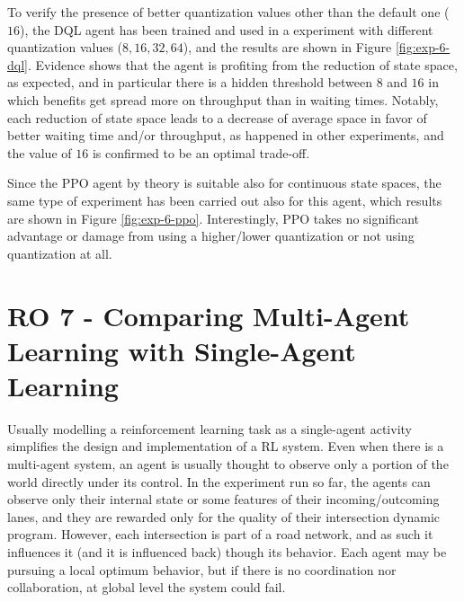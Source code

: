 To verify the presence of better quantization values other than the default one ($16$), the DQL agent has been trained and used in a experiment with different quantization values ($8, 16, 32, 64$), and the results are shown in Figure \ref{fig:exp-6-dql}.
Evidence shows that the agent is profiting from the reduction of state space, as expected, and in particular there is a hidden threshold between $8$ and $16$ in which benefits get spread more on throughput than in waiting times.
Notably, each reduction of state space leads to a decrease of average space in favor of better waiting time and/or throughput, as happened in other experiments, and the value of $16$ is confirmed to be an optimal trade-off.

Since the PPO agent by theory is suitable also for continuous state spaces, the same type of experiment has been carried out also for this agent, which results are shown in Figure \ref{fig:exp-6-ppo}.
Interestingly, PPO takes no significant advantage or damage from using a higher/lower quantization or not using quantization at all.



\section{RO 7 - Comparing Multi-Agent Learning with Single-Agent Learning}

Usually modelling a reinforcement learning task as a single-agent activity simplifies the design and implementation of a RL system.
Even when there is a multi-agent system, an agent is usually thought to observe only a portion of the world directly under its control.
In the experiment run so far, the agents can observe only their internal state or some features of their incoming/outcoming lanes, and they are rewarded only for the quality of their intersection dynamic program.
However, each intersection is part of a road network, and as such it influences it (and it is influenced back) though its behavior.
Each agent may be pursuing a local optimum behavior, but if there is no coordination nor collaboration, at global level the system could fail.

